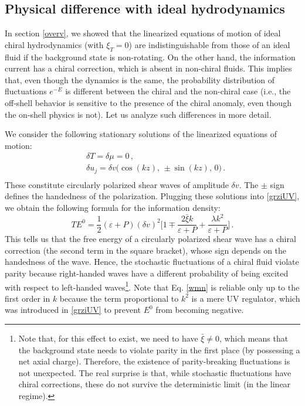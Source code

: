 \documentclass[a4paper, amsfonts, amssymb, amsmath, reprint, showkeys, nofootinbib, twoside,notitlepage,onecolumn,preprintnumbers]{revtex4-2}
\theoremstyle{definition}
\theoremstyle{theorem}
\theoremstyle{corollary}
\begin{document}
\subsection{Physical difference with ideal hydrodynamics}\label{bellalafisica}

In section \ref{overv}, we showed that the linearized equations of motion of ideal chiral hydrodynamics (with $\xi_T=0$) are indistinguishable from those of an ideal fluid if the background state is non-rotating. On the other hand, the information current has a chiral correction, which is absent in non-chiral fluids. This implies that, even though the dynamics is the same, the probability distribution of fluctuations $e^{-E}$ is different between the chiral and the non-chiral case (i.e., the off-shell behavior is sensitive to the presence of the chiral anomaly, even though the on-shell physics is not). Let us analyze such differences in more detail.

We consider the following stationary solutions of the linearized equations of motion:
\begin{equation}\label{circuz}
\begin{split}
   & \delta T = \delta \mu =0 \, , \\
    & \delta u_j =\delta v \big( \cos(kz), \,  \pm\sin(kz), \, 0 \big) \, . \\
\end{split}
\end{equation}
These constitute circularly polarized shear waves of amplitude $\delta v$. The $\pm$ sign defines the handedness of the polarization. Plugging these solutions into \eqref{grziUV}, we obtain the following formula for the information density:
\begin{equation}\label{wmn}
    TE^0 = \dfrac{1}{2} (\varepsilon{+}P) (\delta v)^2 \bigg[ 1 \mp \dfrac{2\bar{\xi} k}{\varepsilon{+}P}+\dfrac{\lambda k^2}{\varepsilon{+}P} \bigg] \, . 
\end{equation}
This tells us that the free energy of a circularly polarized shear wave has a chiral correction (the second term in the square bracket), whose sign depends on the handedness of the wave. Hence, the stochastic fluctuations of a chiral fluid violate parity because right-handed waves have a different probability of being excited with respect to left-handed waves\footnote{Note that, for this effect to exist, we need to have $\bar{\xi} \neq 0$, which means that the background state needs to violate parity in the first place (by possessing a net axial charge). Therefore, the existence of parity-breaking fluctuations is not unexpected. The real surprise is that, while stochastic fluctuations have chiral corrections, these do not survive the deterministic limit (in the linear regime).}.  Note that Eq. \eqref{wmn} is reliable only up to the first order in $k$ because the term proportional to $k^2$ is a mere UV regulator, which was introduced in \eqref{grziUV} to prevent $E^0$ from becoming negative. 
\end{document}
